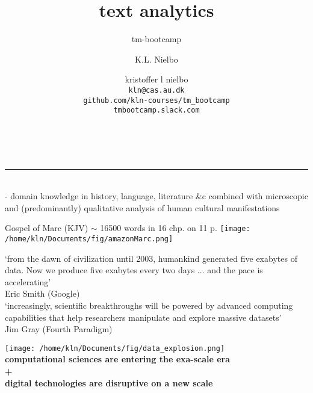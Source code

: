 \documentclass[8pt]{beamer}
\author{K.L. Nielbo}
\title{\textbf{text analytics}}
\subtitle{tm-bootcamp}
\author{kristoffer l nielbo \\\texttt{kln@cas.au.dk\\github.com/kln-courses/tm\_bootcamp\\tmbootcamp.slack.com}}
\date{}
\institute{IMC$\mid$AARHUS UNIVERSITY}
\begin{document}
\frame{\titlepage} 


\begin{frame}
	\begin{center}
		\\
	\end{center}
	\bigskip
	\noindent\rule{4cm}{0.8pt}\\
	- domain knowledge in history, language, literature \&c combined with microscopic and (predominantly) qualitative analysis of human cultural manifestations\\ 
\end{frame}



\begin{frame}
	\begin{center}
	Gospel of Marc (KJV) $\sim$ 16500 words in 16 chp. on 11 p.
	\bigskip
		\texttt{[image: /home/kln/Documents/fig/amazonMarc.png]}
	\end{center}
\end{frame}

\begin{frame}
`from the dawn of civilization until 2003, humankind generated five exabytes of data. Now we produce \colorbox{red!30}{five exabytes every two days} ... and the pace is accelerating'\\ \flushright Eric Smith (Google)\\
\bigskip
\flushleft `increasingly, scientific breakthroughs will be powered by advanced computing capabilities that help researchers manipulate and \colorbox{red!30}{explore massive datasets}'\\ \flushright Jim Gray (Fourth Paradigm)
\end{frame}


\begin{frame}
	\begin{center}
		\texttt{[image: /home/kln/Documents/fig/data\_explosion.png]}\\
	\bigskip 
	\textbf{computational sciences are entering the exa-scale era}\\
	\textbf{+}\\
	\textbf{digital technologies are disruptive on a new scale}\\
	\end{center}
\end{frame}
\end{document}
